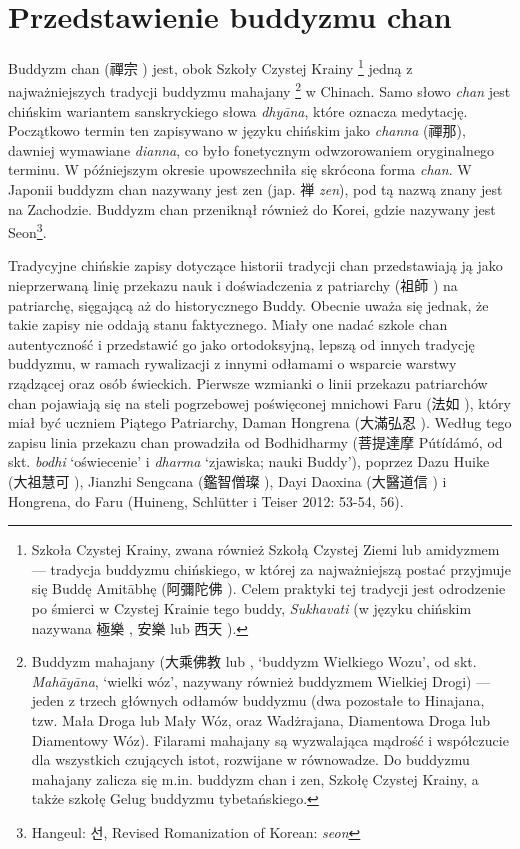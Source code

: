 \chapter{Przedstawienie buddyzmu chan}
Buddyzm chan (禪宗 ) jest, obok Szkoły Czystej Krainy%
\footnote{Szkoła Czystej Krainy, zwana również Szkołą Czystej Ziemi lub amidyzmem --- tradycja buddyzmu chińskiego, w której za najważniejszą postać przyjmuje się Buddę Amitābhę (阿彌陀佛 ). Celem praktyki tej tradycji jest odrodzenie po śmierci w Czystej Krainie tego buddy, \textit{Sukhavati} (w języku chińskim nazywana 極樂 , 安樂  lub 西天 ).}
jedną z najważniejszych tradycji buddyzmu mahajany%
\footnote{Buddyzm mahajany (大乘佛教  lub , `buddyzm Wielkiego Wozu', od skt. \textit{Mahāyāna}, `wielki wóz', nazywany również buddyzmem Wielkiej Drogi) --- jeden z trzech głównych odłamów buddyzmu (dwa pozostałe to Hinajana, tzw. Mała Droga lub Mały Wóz, oraz Wadżrajana, Diamentowa Droga lub Diamentowy Wóz). Filarami mahajany są wyzwalająca mądrość i współczucie dla wszystkich czujących istot, rozwijane w równowadze. Do buddyzmu mahajany zalicza się m.in. buddyzm chan i zen, Szkołę Czystej Krainy, a także szkołę Gelug buddyzmu tybetańskiego.}
w Chinach. Samo słowo \textit{chan} jest chińskim wariantem %
sanskryckiego słowa \textit{dhyāna}, które oznacza medytację.
Początkowo termin ten zapisywano w języku chińskim jako \textit{channa} (禪那), dawniej wymawiane \textit{dianna}, co było fonetycznym odwzorowaniem oryginalnego terminu.
W późniejszym okresie upowszechniła się skrócona forma \textit{chan}.
W Japonii buddyzm chan nazywany jest zen (jap. {\ipaexgothic 禅} \textit{zen}), pod tą nazwą znany jest na Zachodzie.
Buddyzm chan przeniknął również do Korei, gdzie nazywany jest Seon\footnote{Hangeul: {\Korean 선}, Revised Romanization of Korean: \textit{seon}}.

Tradycyjne chińskie zapisy dotyczące historii tradycji chan przedstawiają ją jako nieprzerwaną linię przekazu nauk i doświadczenia z patriarchy (祖師 ) na patriarchę, sięgającą aż do historycznego Buddy.
Obecnie uważa się jednak, że takie zapisy nie oddają stanu faktycznego.
Miały one nadać szkole chan autentyczność i przedstawić go jako ortodoksyjną, lepszą od innych tradycję buddyzmu, w ramach rywalizacji z innymi odłamami o wsparcie warstwy rządzącej oraz osób świeckich.
Pierwsze wzmianki o linii przekazu patriarchów chan pojawiają się na steli pogrzebowej poświęconej mnichowi Faru (法如 ), który miał być uczniem Piątego Patriarchy, Daman Hongrena (大滿弘忍 ).
Według tego zapisu linia przekazu chan prowadziła od Bodhidharmy (菩提達摩 Pútídámó, od skt. \textit{bodhi} `oświecenie' i \textit{dharma} `zjawiska; nauki Buddy'), poprzez Dazu Huike  (大祖慧可 ), Jianzhi Sengcana (鑑智僧璨 ), Dayi Daoxina (大醫道信 ) i Hongrena, do Faru
(Huineng, Schlütter i Teiser 2012: 53-54, 56).

